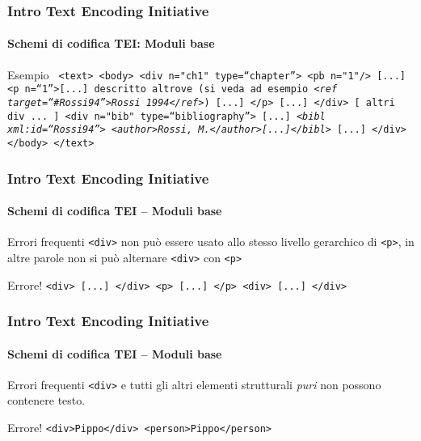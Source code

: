\begin{frame}
	\frametitle{Intro Text Encoding Initiative}
	\framesubtitle{Schemi di codifica TEI: Moduli base}
	\addtocounter{nframe}{1}

	\begin{block}{Esempio}
       \texttt{
           <text>
        <body>
        <div n="ch1" type=``chapter''> <pb n="1"/> [...]
        <p n=``1''>[...] descritto altrove (si veda ad
        esempio \emph{<ref target=``\#Rossi94''>Rossi 1994</ref>})
        [...] </p> [...]
        </div>
        [ altri div ... ]
        <div n="bib" type=``bibliography''>
        [...]
        \emph{<bibl xml:id=``Rossi94''>
        <author>Rossi, M.</author>[...]</bibl>}
        [...]
        </div>
        </body>
        </text>}
    \end{block}
\end{frame}

\begin{frame}
	\frametitle{Intro Text Encoding Initiative}
	\framesubtitle{Schemi di codifica TEI – Moduli base}
	\addtocounter{nframe}{1}

    \begin{block}{Errori frequenti}
        \texttt{<div>} non può essere usato allo stesso livello gerarchico
        di \texttt{<p>}, in altre parole non si può alternare \texttt{<div>} con
        \texttt{<p>}
    \end{block}
    
    \begin{block}{Errore!}
        \texttt{<div> [...] </div>
        <p> [...] </p>
        <div> [...] </div>}
    \end{block}
\end{frame}


\begin{frame}
	\frametitle{Intro Text Encoding Initiative}
	\framesubtitle{Schemi di codifica TEI – Moduli base}
	\addtocounter{nframe}{1}

    \begin{block}{Errori frequenti}
        \texttt{<div>} e tutti gli altri elementi strutturali \textit{puri} non
        possono contenere testo.
       
    \end{block}
    
    \begin{block}{Errore!}
        \texttt{<div>Pippo</div>
        <person>Pippo</person>}
    \end{block}
    

\end{frame}



